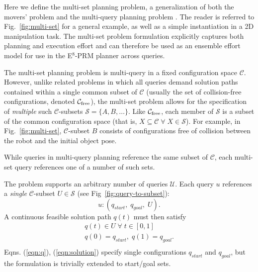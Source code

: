 Here we define the multi-set planning problem,
a generalization of both the movers' problem
and the multi-query planning problem%
\cite{kavrakietal1996prm}.
The reader is referred to
Fig.~\ref{fig:multi-set}
for a general example,
as well as a simple instantiation in a 2D manipulation task.
The multi-set problem formulation
explicitly captures both planning and execution effort
and can therefore be used as an ensemble effort model
for use in the E$^8$-PRM planner across queries.

The multi-set planning problem is multi-query in
a fixed configuration space $\mathcal{C}$.
However, unlike related problems in which all
queries demand solution paths contained within a single common subset of
$\mathcal{C}$
(usually the set of collision-free configurations, denoted
$\mathcal{C}_{\mbox{\scriptsize free}}$),
the multi-set problem allows for the specification of
\emph{multiple} such $\mathcal{C}$-subsets
$\mathcal{S} = \{ A, B, \dots \}$.
Like $\mathcal{C}_{\mbox{\scriptsize free}}$,
each member of $\mathcal{S}$
is a subset of the common configuration space
(that is,
$X \subseteq \mathcal{C} \;\forall\; X \in \mathcal{S}$).
For example,
in Fig.~\ref{fig:multi-set},
$\mathcal{C}$-subset $B$
consists of configurations
free of collision between the robot and
the initial object pose.

\begin{marginfigure}
   \centering
   \vspace{-0.05in}
   \vspace{0.1in}
   \caption{While queries in multi-query planning reference
     the same subset of $\mathcal{C}$,
     each multi-set query references one of a number of such sets.}
   \label{fig:query-to-subset}
\end{marginfigure}

The problem supports an arbitrary number of queries $\mathcal{U}$.
Each query $u$ references a \emph{single}
$\mathcal{C}$-subset $U \in \mathcal{S}$
(see Fig~\ref{fig:query-to-subset}):
\begin{equation}
  u : ( q_{start},\; q_{goal},\; U ) .
  \label{eqn:q}
\end{equation}
A continuous feasible solution path $q(t)$ must then satisfy
\begin{equation}
  \begin{array}{c}
  q(t) \in U \;\forall\; t \in [0,1] \\
  q(0) = q_{start},\; q(1) = q_{goal} . \\
  \end{array}
  \label{eqn:solution}
\end{equation}
Eqns. (\ref{eqn:q}), (\ref{eqn:solution})
specify single configurations
$q_{start}$ and $q_{goal}$,
but the formulation is trivially extended to start/goal sets.

